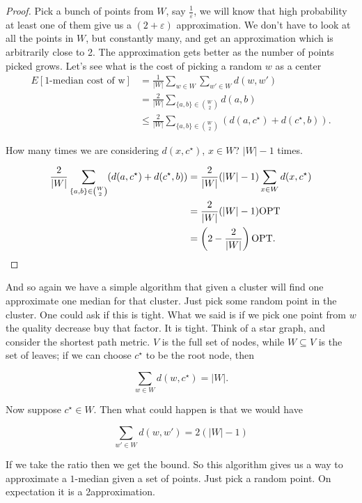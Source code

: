 \begin{proof}
	Pick a bunch of points from $W$, say $\frac{1}{\varepsilon}$, we will know that high probability at least one of them give us a $(2 + \varepsilon)$ approximation. We don't have to look at all the points in $W$, but constantly many, and get an approximation which is arbitrarily close to 2. The approximation gets better as the number of points picked grows. Let's see what is the cost of picking a random $w$ as a center
	\begin{align}
		E[\text{1-median cost of w}] &= \frac{1}{|W|}\sum_{w \in W}\sum_{w' \in W} d(w, w')\\
		&= \frac{2}{|W|}\sum_{\{a, b\} \in \binom{W}{2}}d(a, b)\\
		&\leq \frac{2}{|W|}\sum_{\{a, b\} \in \binom{W}{2}}(d(a, c^\star) + d(c^\star, b)).
	\end{align}
	
	How many times we are considering $d(x, c^\star)$, $x \in W$? $|W| - 1$ times.
	
	\begin{align}
	\frac{2}{|W|}\sum_{\{a, b\} \in \binom{W}{2}}(d(a, c^\star) + d(c^\star, b)) &= 	\frac{2}{|W|}(|W| -1)\sum_{x \in W}d(x, c^\star)\\
		&=\frac{2}{|W|}(|W| -1)\text{OPT}\\
		&=\left(2 - \frac{2}{|W|}\right)\text{OPT}.
	\end{align}
\end{proof}

And so again we have a simple algorithm that given a cluster will find one approximate one median for that cluster. Just pick some random point in the cluster. One could ask if this is tight. What we said is if we pick one point from $w$ the quality decrease buy that factor. It is tight. Think of a star graph, and consider the shortest path metric. $V$ is the full set of nodes, while $W \subseteq V$ is the set of leaves; if we can choose $c^\star$ to be the root node, then

\begin{equation}
\sum_{w \in W} d(w, c^\star) = |W|.
\end{equation} 

Now suppose $c^\star \in W$. Then what could happen is that we would have


\begin{equation}
\sum_{w' \in W} d(w, w') =2(|W| - 1)
\end{equation} 

If we take the ratio then we get the bound. So this algorithm gives us a way to approximate a $1$-median given a set of points. Just pick a random point. On expectation it is a 2approximation.

